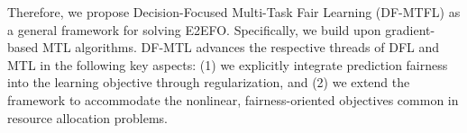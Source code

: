 \documentclass[ijoc,sglanonrev]{informs4}
\begin{document}
Therefore, we propose Decision-Focused Multi-Task Fair Learning (DF-MTFL) as a general framework for solving E2EFO. Specifically, we build upon gradient-based MTL algorithms. DF-MTL advances the respective threads of DFL and MTL in the following key aspects:
(1) we explicitly integrate prediction fairness into the learning objective through regularization, and
(2) we extend the framework to accommodate the nonlinear, fairness-oriented objectives common in resource allocation problems.


\end{document}
